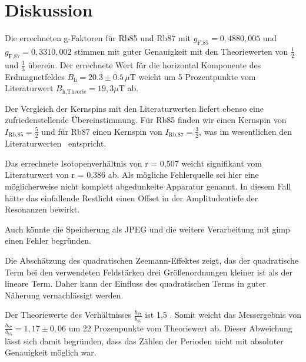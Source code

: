 \section{Diskussion}
Die errechneten g-Faktoren für Rb85 und Rb87 mit $g_\text{F,85} = 0,488 $\pm$ 0,005$ und
$g_\text{F,87} = 0,331 $\pm$ 0,002$ stimmen mit guter Genauigkeit mit den Theoriewerten von $\frac{1}{2}$ und $\frac{1}{3}$ überein.
Der errechnete Wert für die horizontal Komponente des Erdmagnetfeldes $B_\text{h} = 20.3\pm0.5\,\mu\text{T}$ weicht um 5 Prozentpunkte vom
Literaturwert $B_\text{h,Theorie} = 19,3\mu\text{T}$ \cite{hB} ab.

Der Vergleich der Kernspins mit den Literaturwerten liefert ebenso eine zufriedenstellende Übereinstimmung.
Für Rb85 finden wir einen Kernspin von  $I_\text{Rb,85} = \frac{5}{2}$ und für Rb87 einen Kernspin von $I_\text{Rb,87} = \frac{3}{2}$, was im wesentlichen den Literaturwerten \cite{coreSpin} entspricht.

Das errechnete Isotopenverhältnis von r = 0,507 weicht signifikant vom Literaturwert von r = 0,386 \cite{isoVer} ab. Als mögliche Fehlerquelle sei hier eine möglicherweise nicht komplett abgedunkelte Apparatur genannt. In diesem Fall hätte das einfallende Restlicht
einen Offset in der Amplitudentiefe der Resonanzen bewirkt.

Auch könnte die Speicherung als JPEG und die weitere Verarbeitung mit gimp einen Fehler begründen.

Die Abschätzung des quadratischen Zeemann-Effektes zeigt, das der quadratische Term bei den verwendeten Feldstärken drei Größenordnungen kleiner ist als der lineare Term. Daher kann der Einfluss des quadratischen Terms in guter Näherung vernachlässigt werden.

Der Theoriewerte des Verhältnisses $\frac{b_{87}}{b_{85}}$ ist 1,5 \cite{FP}. Somit weicht das Messergebnis von $\frac{b_{87}}{b_{85}} = 1,17 \pm 0,06$ um 22 Prozenpunkte vom Theoriewert ab.
Dieser Abweichung lässt sich damit begründen, dass das Zählen der Perioden nicht mit absoluter Genauigkeit möglich war.

\printbibliography
